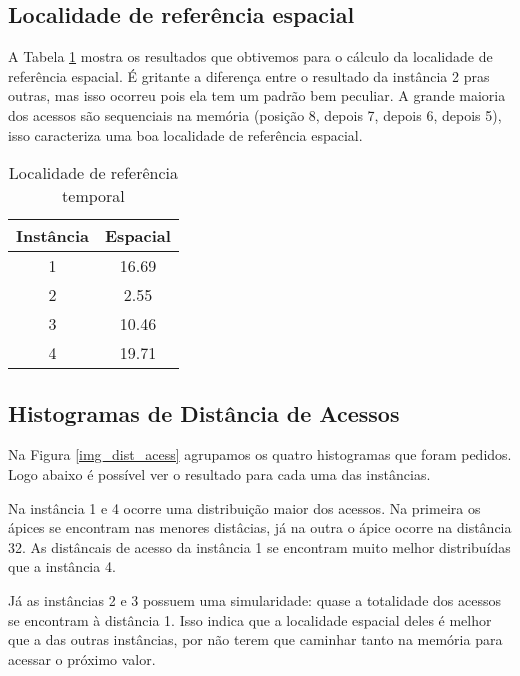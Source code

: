 \documentclass[12pt]{article}
\begin{document}
\subsection{Localidade de referência espacial}
\label{loc_ref_esp}

A Tabela \ref{tab_ref_esp} mostra os resultados que obtivemos para o cálculo da localidade de referência espacial. É gritante a diferença entre o resultado da instância 2 pras outras, mas isso ocorreu pois ela tem um padrão bem peculiar. A grande maioria dos acessos são sequenciais na memória (posição 8, depois 7, depois 6, depois 5), isso caracteriza uma boa localidade de referência espacial.


\begin{table}[h!]
\centering
\begin{footnotesize}
\begin{tabular}{|c|c|}
\hline
\textbf{Instância}  & \textbf{Espacial}  \\ \hline
1 &  16.69\\ \hline
2 & 2.55\\ \hline
3 &  10.46\\ \hline
4 &  19.71\\ \hline

\end{tabular}
\end{footnotesize}
\caption{Localidade de referência temporal \label{tab_ref_esp}}
\end{table}


\subsection{Histogramas de Distância de Acessos}
\label{hist_dist_acess}


Na Figura \ref{img_dist_acess} agrupamos os quatro histogramas que foram pedidos. Logo abaixo é possível ver o resultado para cada uma das instâncias.

Na instância 1 e 4 ocorre uma distribuição maior dos acessos. Na primeira os ápices se encontram nas menores distâcias, já na outra o ápice ocorre na distância 32. As distâncais de acesso da instância 1 se encontram muito melhor distribuídas que a instância 4.

Já as instâncias 2 e 3 possuem uma simularidade: quase a totalidade dos acessos se encontram à distância 1. Isso indica que a localidade espacial deles é melhor que a das outras instâncias, por não terem que caminhar tanto na memória para acessar o próximo valor.
\end{document}
